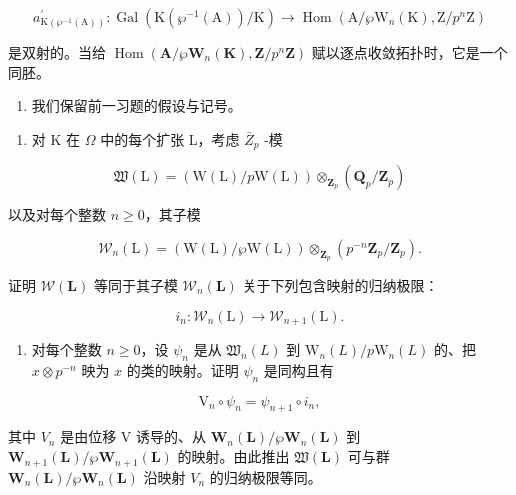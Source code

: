 \[
a _ {\mathrm{K} (\wp ^ {- 1} (\mathrm{A}))} ^ {\prime}: \operatorname{Gal} \left(\mathrm{K} \left(\wp ^ {- 1} (\mathrm{A})\right) / \mathrm{K}\right)\rightarrow \operatorname{Hom} \left(\mathrm{A} / \wp \mathrm{W} _ {n} (\mathrm{K}), \mathrm{Z} / p ^ {n} \mathrm{Z}\right)
\]

是双射的。当给 \(\operatorname{Hom}(\mathbf{A}/\wp\mathbf{W}_n(\mathbf{K}), \mathbf{Z}/p^n\mathbf{Z})\) 赋以逐点收敛拓扑时，它是一个同胚。

\begin{enumerate}
\def\labelenumi{\arabic{enumi})}
\setcounter{enumi}{19}
\tightlist
\item
  我们保留前一习题的假设与记号。
\end{enumerate}

\begin{enumerate}
\def\labelenumi{\alph{enumi})}
\tightlist
\item
  对 K 在 \(\Omega\) 中的每个扩张 L，考虑 \(\bar{Z}_{p}\) -模
\end{enumerate}

\[
\mathfrak {W} (\mathrm{L}) = \left(\mathrm{W} (\mathrm{L}) / p \mathrm{W} (\mathrm{L})\right) \otimes_ {\mathbf {Z} _ {p}} \left(\mathbf {Q} _ {p} / \mathbf {Z} _ {p}\right)
\]

以及对每个整数 \(n \geqslant 0\)，其子模

\[
\mathcal {W} _ {n} (\mathrm{L}) = \left(\mathrm{W} (\mathrm{L}) / \wp \mathrm{W} (\mathrm{L})\right) \otimes_ {\mathbf {Z} _ {p}} \left(p ^ {- n} \mathbf {Z} _ {p} / \mathbf {Z} _ {p}\right).
\]

证明 \(\mathcal{W}(\mathbf{L})\) 等同于其子模 \(\mathcal{W}_{n}(\mathbf{L})\) 关于下列包含映射的归纳极限：

\[
i _ {n}: \mathcal {W} _ {n} (\mathrm{L}) \rightarrow \mathcal {W} _ {n + 1} (\mathrm{L}).
\]

\begin{enumerate}
\def\labelenumi{\alph{enumi})}
\setcounter{enumi}{1}
\tightlist
\item
  对每个整数 \(n \geqslant 0\)，设 \(\psi_n\) 是从 \(\mathfrak{W}_n(L)\) 到 \(\mathrm{W}_n(L)/p\mathrm{W}_n(L)\) 的、把 \(x \otimes p^{-n}\) 映为 \(x\) 的类的映射。证明 \(\psi_n\) 是同构且有
\end{enumerate}

\[
\mathrm{V} _ {n} \circ \psi_ {n} = \psi_ {n + 1} \circ i _ {n},
\]

其中 \(V_{n}\) 是由位移 V 诱导的、从 \(\mathbf{W}_{n}(\mathbf{L})/\wp\mathbf{W}_{n}(\mathbf{L})\) 到 \(\mathbf{W}_{n+1}(\mathbf{L})/\wp\mathbf{W}_{n+1}(\mathbf{L})\) 的映射。由此推出 \(\mathfrak{W}(\mathbf{L})\) 可与群 \(\mathbf{W}_{n}(\mathbf{L})/\wp\mathbf{W}_{n}(\mathbf{L})\) 沿映射 \(V_{n}\) 的归纳极限等同。

